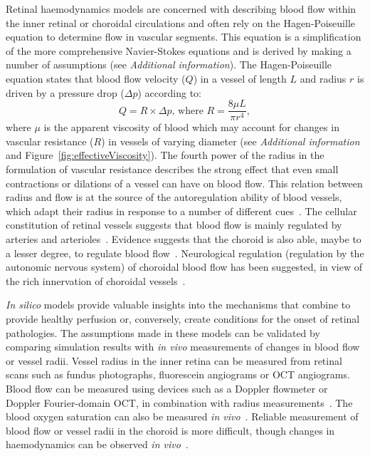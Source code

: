 \documentclass{article}
\begin{document}
Retinal haemodynamics models are concerned with describing blood flow within the inner retinal or choroidal circulations and often rely on the Hagen-Poiseuille equation to determine flow in vascular segments.
This equation is a simplification of the more comprehensive Navier-Stokes equations and is derived by making a number of assumptions (see \textit{Additional information}).
The Hagen-Poiseuille equation states that blood flow velocity ($Q$) in a vessel of length $L$ and radius $r$ is driven by a pressure drop ($\Delta p$) according to:
\begin{equation*}
  \label{eq:Hagen-Poiseuille}
  Q = \mathit R\times\Delta p \mbox{, where } \mathit{R} = \frac{8\mu L}{\pi r^4},
\end{equation*}
where $\mu$ is the apparent viscosity of blood which may account for changes in vascular resistance ($\mathit R$) in vessels of varying diameter (see \textit{Additional information} and Figure~\ref{fig:effectiveViscosity}).
The fourth power of the radius in the formulation of vascular resistance describes the strong effect that even small contractions or dilations of a vessel can have on blood flow.
This relation between radius and flow is at the source of the autoregulation ability of blood vessels, which adapt their radius in response to a number of different cues~\cite{Kur_2012}.
The cellular constitution of retinal vessels suggests that blood flow is mainly regulated by arteries and arterioles~\cite{An_2020,Kur_2012}.
Evidence suggests that the choroid is also able, maybe to a lesser degree, to regulate blood flow~\cite{Polska_2007,Riva_1997}.
Neurological regulation (regulation by the autonomic nervous system) of choroidal blood flow has been suggested, in view of the rich innervation of choroidal vessels~\cite{BeharCohen_2020,Polska_2007}.

\textit{In silico} models provide valuable insights into the mechanisms that combine to provide healthy perfusion or, conversely, create conditions for the onset of retinal pathologies.
The assumptions made in these models can be validated by comparing simulation results with \textit{in vivo} measurements of changes in blood flow or vessel radii.
Vessel radius in the inner retina can be measured from retinal scans such as fundus photographs, fluorescein angiograms or OCT angiograms.
Blood flow can be measured using devices such as a Doppler flowmeter or Doppler Fourier-domain OCT, in combination with radius measurements~\cite{DoblhoffDier_2014,Wang_2009}.
The blood oxygen saturation can also be measured \textit{in vivo}~\cite{Geirsdottir_2013}.
Reliable measurement of blood flow or vessel radii in the choroid is more difficult, though changes in haemodynamics can be observed \textit{in vivo}~\cite{Riva_1997,Scherm_2019}.
\end{document}
